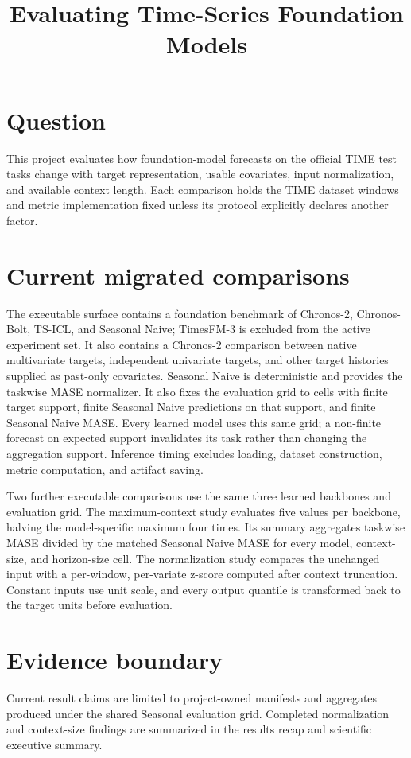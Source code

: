 \documentclass[11pt]{article}
\title{Evaluating Time-Series Foundation Models}
\author{}
\date{}
\begin{document}
\maketitle

\section{Question}

This project evaluates how foundation-model forecasts on the official TIME
test tasks change with target representation, usable covariates, input
normalization, and available context length. Each comparison holds the TIME
dataset windows and metric implementation fixed unless its protocol explicitly
declares another factor.

\section{Current migrated comparisons}

The executable surface contains a foundation benchmark of Chronos-2,
Chronos-Bolt, TS-ICL, and Seasonal Naive; TimesFM-3 is excluded from the active
experiment set. It also contains a Chronos-2 comparison between native
multivariate targets, independent univariate targets, and other target
histories supplied as past-only covariates. Seasonal Naive is deterministic
and provides the taskwise MASE
normalizer. It also fixes the evaluation grid to cells with finite target
support, finite Seasonal Naive predictions on that support, and finite
Seasonal Naive MASE. Every learned model uses this same grid; a non-finite
forecast on expected support invalidates its task rather than changing the
aggregation support. Inference timing excludes loading, dataset construction,
metric computation, and artifact saving.

Two further executable comparisons use the same three learned backbones and
evaluation grid. The maximum-context study evaluates five values per backbone,
halving the model-specific maximum four times. Its summary aggregates
taskwise MASE divided by the matched Seasonal Naive MASE for every model,
context-size, and horizon-size cell. The normalization study compares the
unchanged input with a per-window, per-variate z-score computed after context
truncation. Constant inputs use unit scale, and every output quantile is
transformed back to the target units before evaluation.

\section{Evidence boundary}

Current result claims are limited to project-owned manifests and aggregates
produced under the shared Seasonal evaluation grid. Completed normalization
and context-size findings are summarized in the results recap and scientific
executive summary.
\end{document}
